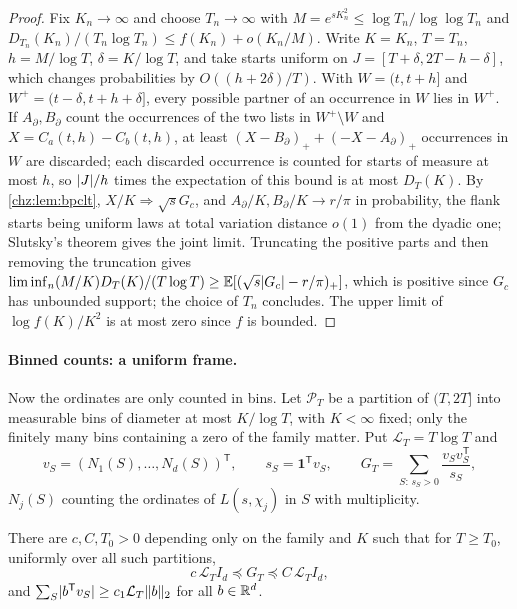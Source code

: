 \begin{proof}
Fix $K_n\to\infty$ and choose $T_n\to\infty$ with $M=e^{sK_n^2}\le\log T_n/\log\log T_n$ and
$D_{T_n}(K_n)/(T_n\log T_n)\le f(K_n)+o(K_n/M)$. Write $K=K_n$, $T=T_n$, $h=M/\log T$, $\delta=K/\log T$, and take starts
uniform on $J=[T+\delta,2T-h-\delta]$, which changes probabilities by $O((h+2\delta)/T)$. With $W=(t,t+h]$ and
$W^+=(t-\delta,t+h+\delta]$, every possible partner of an occurrence in $W$ lies in $W^+$. If $A_\partial,B_\partial$ count the
occurrences of the two lists in $W^+\setminus W$ and $X=C_a(t,h)-C_b(t,h)$, at least $(X-B_\partial)_++(-X-A_\partial)_+$
occurrences in $W$ are discarded; each discarded occurrence is counted for starts of measure at most $h$, so
$\lvert J\rvert/h$ times the expectation of this bound is at most $D_T(K)$. By \cref{chz:lem:bpclt}, $X/K\Rightarrow\sqrt sG_c$, and
$A_\partial/K,B_\partial/K\to r/\pi$ in probability, the flank starts being uniform laws at total variation distance $o(1)$
from the dyadic one; Slutsky's theorem gives the joint limit. Truncating the positive parts and then removing the
truncation gives $\liminf_n(M/K)D_T(K)/(T\log T)\ge\mathbb{E}[(\sqrt s\lvert G_c\rvert-r/\pi)_+]$, which is positive since $G_c$ has
unbounded support; the choice of $T_n$ concludes. The upper limit of $\log f(K)/K^2$ is at most zero since $f$ is
bounded.
\end{proof}

\paragraph{Binned counts: a uniform frame.}
Now the ordinates are only counted in bins. Let $\mathcal P_T$ be a partition of $(T,2T]$ into measurable bins of
diameter at most $K/\log T$, with $K<\infty$ fixed; only the finitely many bins containing a zero of the family
matter. Put $\mathcal L_T=T\log T$ and
\[
 v_S=(N_1(S),\dots,N_d(S))^{\mathsf T},\qquad s_S=\mathbf 1^{\mathsf T}v_S,\qquad G_T=\sum_{S:\,s_S>0}\frac{v_Sv_S^{\mathsf T}}{s_S},
\]
$N_j(S)$ counting the ordinates of $L(s,\chi_j)$ in $S$ with multiplicity.

\begin{theorem}\label{chz:thm:frame}
There are $c,C,T_0>0$ depending only on the family and $K$ such that for $T\ge T_0$, uniformly over all such
partitions,
\[
 c\,\mathcal L_TI_d\preceq G_T\preceq C\,\mathcal L_TI_d,
\]
and $\sum_S\lvert b^{\mathsf T}v_S\rvert\ge c_1\mathcal L_T\lVert b\rVert_2$ for all $b\in\mathbb{R}^d$.
\end{theorem}

